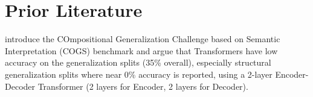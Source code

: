 \documentclass[11pt]{article}
\begin{document}


\section{Prior Literature}

\cite{KimLinzen2020} introduce the COmpositional Generalization Challenge based on Semantic Interpretation (COGS) benchmark and argue that Transformers have low accuracy on the generalization splits (35\% overall), especially structural generalization splits where near 0\% accuracy is reported, using a 2-layer Encoder-Decoder Transformer (2 layers for Encoder, 2 layers for Decoder).
\end{document}
